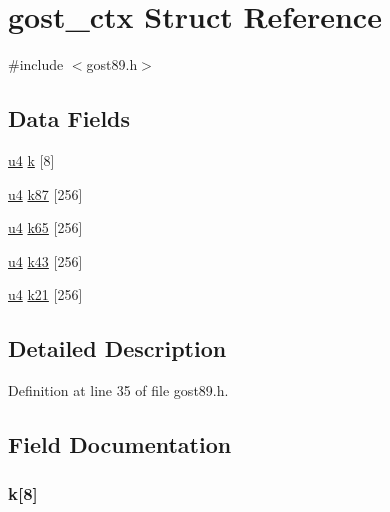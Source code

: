 \hypertarget{structgost__ctx}{}\section{gost\+\_\+ctx Struct Reference}
\label{structgost__ctx}


{\ttfamily \#include $<$gost89.\+h$>$}

\subsection*{Data Fields}
\begin{DoxyCompactItemize}
\item 
\hyperlink{gost89_8h_a1c578f747523444a11d6764d7935bac9}{u4} \hyperlink{structgost__ctx_a2204ffcda30bed6a384de8d38f63eac0}{k} \mbox{[}8\mbox{]}
\item 
\hyperlink{gost89_8h_a1c578f747523444a11d6764d7935bac9}{u4} \hyperlink{structgost__ctx_a1ff176d30a3a459d6fae718bfec24136}{k87} \mbox{[}256\mbox{]}
\item 
\hyperlink{gost89_8h_a1c578f747523444a11d6764d7935bac9}{u4} \hyperlink{structgost__ctx_a901173b7237b61afbfc7b958f7a4eb32}{k65} \mbox{[}256\mbox{]}
\item 
\hyperlink{gost89_8h_a1c578f747523444a11d6764d7935bac9}{u4} \hyperlink{structgost__ctx_a34dd1f48bb5d1e29c1058a7dad3d5a3c}{k43} \mbox{[}256\mbox{]}
\item 
\hyperlink{gost89_8h_a1c578f747523444a11d6764d7935bac9}{u4} \hyperlink{structgost__ctx_a4d82260bd7b49b410516233d275a2b9d}{k21} \mbox{[}256\mbox{]}
\end{DoxyCompactItemize}


\subsection{Detailed Description}


Definition at line 35 of file gost89.\+h.



\subsection{Field Documentation}
\subsubsection[{\texorpdfstring{k}{k}}]{ k\mbox{[}8\mbox{]}}\hypertarget{structgost__ctx_a2204ffcda30bed6a384de8d38f63eac0}{}\label{structgost__ctx_a2204ffcda30bed6a384de8d38f63eac0}


